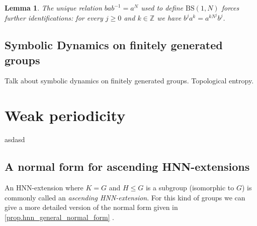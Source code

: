 \documentclass[letterpaper,10pt]{article}
\theoremstyle{plain}
\newtheorem{lemma}[theorem]{Lemma}
\newcommand{\BS}[1][N]{\mathrm{BS}(1,#1)}
\begin{document}
\begin{lemma}\label{bs.further_identifications} The unique relation $bab^{-1}=a^N$ used to define $\BS$ forces further identifications: for every $j\ge 0$ and $k\in \mathbb{Z}$ we have $b^{j}a^k=a^{kN^j}b^j$.
\end{lemma}
	 \subsection{Symbolic Dynamics on finitely generated groups}
Talk about symbolic dynamics on finitely generated groups. Topological entropy.
	
	\section{Weak periodicity}\label{section.weak_periodicity}
	asdasd

	
	\subsection{A normal form for ascending HNN-extensions}\label{subsection.HNN_extensions_normal_form}
   An HNN-extension where $K=G$ and $H\le G$ is a subgroup (isomorphic to $G$) is commonly called an \emph{ascending HNN-extension}. For this kind of groups we can give a more detailed version of the normal form given in \ref{prop.hnn_general_normal_form} .
\end{document}
